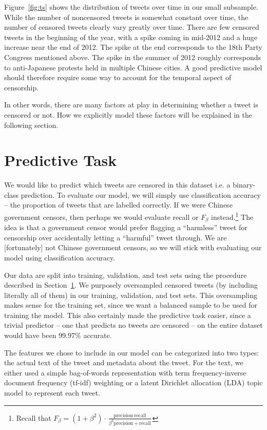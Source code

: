 \documentclass{sig-alternate-05-2015}
\begin{document}
Figure~\ref{fig:ts} shows the distribution of tweets over time in our small subsample. While the number of noncensored tweets is somewhat constant over time, the number of censored tweets clearly vary greatly over time. There are few censored tweets in the beginning of the year, with a spike coming in mid-2012 and a huge increase near the end of 2012. The spike at the end corresponds to the 18th Party Congress mentioned above. The spike in the summer of 2012 roughly corresponds to anti-Japanese protests held in multiple Chinese cities. A good predictive model should therefore require some way to account for the temporal aspect of censorship. 

In other words, there are many factors at play in determining whether a tweet is censored or not. How we explicitly model these factors will be explained in the following section.

\section{Predictive Task} \label{sec:pred}
We would like to predict which tweets are censored in this dataset i.e. a binary-class prediction. To evaluate our model, we will simply use classification accuracy -- the proportion of tweets that are labelled correctly. If we were Chinese government censors, then perhaps we would evaluate recall or $F_\beta$ instead.\footnote{Recall that $F_\beta = (1+\beta^2) \cdot \frac{\text{precision} \cdot \text{recall}}{\beta^2 \text{precision} + \text{recall}}$} The idea is that a government censor would prefer flagging a ``harmless'' tweet for censorship over accidentally letting a ``harmful'' tweet through. We are [fortunately] not Chinese government censors, so we will stick with evaluating our model using classification accuracy. 

Our data are split into training, validation, and test sets using the procedure described in Section~\ref{sec:pred}. We purposely oversampled censored tweets (by including literally all of them) in our training, validation, and test sets. This oversampling makes sense for the training set, since we want a balanced sample to be used for training the model. This also certainly made the predictive task easier, since a trivial predictor -- one that predicts no tweets are censored -- on the entire dataset would have been 99.97\% accurate. 

The features we chose to include in our model can be categorized into two types: the actual text of the tweet and metadata about the tweet. For the text, we either used a simple bag-of-words representation with term frequency-inverse document frequency (tf-idf) weighting or a latent Dirichlet allocation (LDA) topic model to represent each tweet. 
\end{document}
